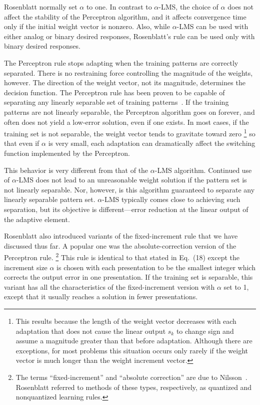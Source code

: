 \documentclass[10pt,twocolumn]{article}
\begin{document}
Rosenblatt normally set $\alpha$ to one. In contrast to $\alpha$-LMS, the choice
of $\alpha$ does not affect the stability of the Perceptron algorithm, and it
affects convergence time only if the initial weight vector is nonzero. Also,
while $\alpha$-LMS can be used with either analog or binary desired responses,
Rosenblatt's rule can be used only with binary desired responses.

The Perceptron rule stops adapting when the training patterns are correctly
separated. There is no restraining force controlling the magnitude of the
weights, however. The direction of the weight vector, not its magnitude,
determines the decision function. The Perceptron rule has been proven to be
capable of separating any linearly separable set of training
patterns~\cite{rosen62,block,nilsson,mays}. If the training patterns are not
linearly separable, the Perceptron algorithm goes on forever, and often does not
yield a low-error solution, even if one exists. In most cases, if the training set
is not separable, the weight vector tends to gravitate toward zero%
\footnote{This results because the length of the weight vector decreases with each
adaptation that does not cause the linear output $s_k$ to change sign and assume a
magnitude greater than that before adaptation. Although there are exceptions, for
most problems this situation occurs only rarely if the weight vector is much
longer than the weight increment vector.}
so that even if $\alpha$ is very small, each adaptation can dramatically affect the
switching function implemented by the Perceptron.

This behavior is very different from that of the $\alpha$-LMS algorithm. Continued
use of $\alpha$-LMS does not lead to an unreasonable weight solution if the
pattern set is not linearly separable. Nor, however, is this algorithm guaranteed
to separate any linearly separable pattern set. $\alpha$-LMS typically comes close
to achieving such separation, but its objective is different---error reduction at
the linear output of the adaptive element.

Rosenblatt also introduced variants of the fixed-increment rule that we have
discussed thus far. A popular one was the absolute-correction version of the
Perceptron rule.%
\footnote{The terms ``fixed-increment'' and ``absolute correction'' are due to
Nilsson~\cite{nilsson}. Rosenblatt referred to methods of these types,
respectively, as quantized and nonquantized learning rules.}
This rule is identical to that stated in Eq.~(18) except the increment size
$\alpha$ is chosen with each presentation to be the smallest integer which
corrects the output error in one presentation. If the training set is separable,
this variant has all the characteristics of the fixed-increment version with
$\alpha$ set to 1, except that it usually reaches a solution in fewer
presentations.
\end{document}
